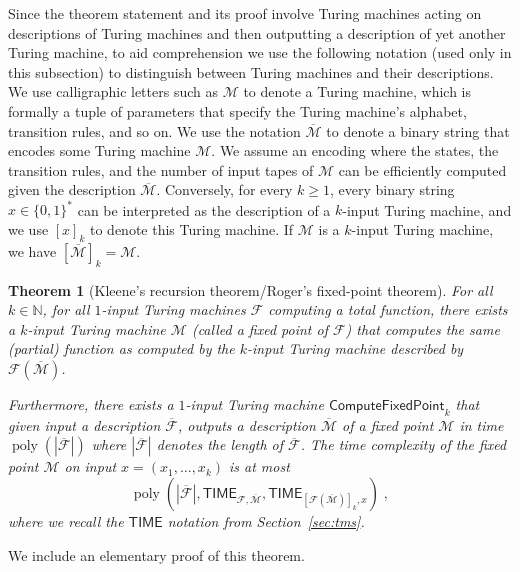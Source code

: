 \documentclass[11pt]{article}
\newtheorem{theorem}{Theorem}[section]
\theoremstyle{definition}
\newcommand{\ol}[1]{\overline{#1}}
\newcommand{\N}{\ensuremath{\mathbb{N}}}
\DeclareMathOperator{\poly}{poly}
\renewcommand{\cal}[1]{\mathcal{#1}}
\newcommand{\TIME}{\mathsf{TIME}}
\newcommand{\tmstyle}[1]{\ensuremath{\mathsf{#1}}}
\newcommand{\ComputeFixedPoint}{\tmstyle{ComputeFixedPoint}}
\begin{document}
Since the theorem statement and its proof involve Turing machines acting on
descriptions of Turing machines and then outputting a description of yet another
Turing machine, to aid comprehension we use the following notation (used only in
this subsection) to distinguish between Turing machines and their descriptions.
We use calligraphic letters such as $\cal{M}$ to denote a Turing machine, which
is formally a tuple of parameters that specify the Turing machine's alphabet,
transition rules, and so on.
We use the notation $\overline{\cal{M}}$ to denote a binary string that encodes
some Turing machine $\cal{M}$.
We assume an encoding where the states, the transition rules, and the number of
input tapes of $\cal{M}$ can be efficiently computed given the description
$\overline{\cal{M}}$.
Conversely, for every $k \geq 1$, every binary string $x \in \{0,1\}^*$ can be
interpreted as the description of a $k$-input Turing machine, and we use $[x]_k$
to denote this Turing machine.
If $\cal{M}$ is a $k$-input Turing machine, we have $[\ol{\cal{M}}]_k=\cal{M}$. 

\begin{theorem}[Kleene's recursion theorem/Roger's fixed-point theorem]
  \label{thm:kleene}
  For all $k \in \N$, for all $1$-input Turing machines $\cal{F}$ computing a
  total function, there exists a $k$-input Turing machine $\cal{M}$ (called a
  \emph{fixed point of $\cal{F}$}) that computes the same (partial) function as
  computed by the $k$-input Turing machine described by
  $\cal{F}(\overline{\cal{M}})$.
	
  Furthermore, there exists a $1$-input Turing machine $\ComputeFixedPoint_k$
  that given input a description $\overline{\cal{F}}$, outputs a description
  $\overline{\cal{M}}$ of a fixed point $\cal{M}$ in time
  $\poly(|\overline{\cal{F}}|)$ where $|\overline{\cal{F}}|$ denotes the length
  of $\overline{\cal{F}}$.
  The time complexity of the fixed point $\cal{M}$ on input $x =
  (x_1,\ldots,x_k)$ is at most
  \begin{equation*}
    \poly(|\ol{\cal{F}}|, \TIME_{\cal{F},\overline{\cal{M}}},
    \TIME_{[\cal{F}(\overline{\cal{M}})]_k,x})\;,
  \end{equation*}
	where we recall the $\TIME$ notation from Section~\ref{sec:tms}.
\end{theorem}

We include an elementary proof of this theorem. 
\end{document}
